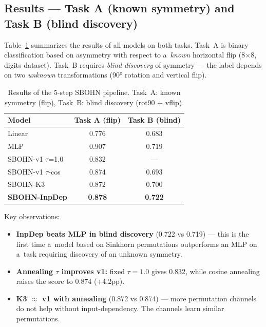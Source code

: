 \subsection{Results --- Task A (known symmetry) and Task B (blind discovery)}

Table~\ref{tab:sbohn_5steps} summarizes the results of all models on both tasks.
Task~A is binary classification based on asymmetry with respect to a~\emph{known} horizontal flip (8$\times$8, digits dataset).
Task~B requires \emph{blind discovery} of symmetry --- the label depends on two \emph{unknown} transformations (90° rotation and vertical flip).

\begin{table}[h]
\centering
\caption{Results of the 5-step SBOHN pipeline. Task~A: known symmetry (flip), Task~B: blind discovery (rot90 + vflip).}
\label{tab:sbohn_5steps}
\begin{tabular}{lcc}
\hline
\textbf{Model} & \textbf{Task A (flip)} & \textbf{Task B (blind)} \\
\hline
Linear             & 0.776 & 0.683 \\
MLP                & 0.907 & 0.719 \\
SBOHN-v1 $\tau$=1.0  & 0.832 & --- \\
SBOHN-v1 $\tau$-cos   & 0.874 & 0.693 \\
SBOHN-K3           & 0.872 & 0.700 \\
\textbf{SBOHN-InpDep} & \textbf{0.878} & \textbf{0.722} \\
\hline
\end{tabular}
\end{table}

Key observations:
\begin{itemize}
    \item \textbf{InpDep beats MLP in blind discovery} (0.722 vs 0.719) --- this is the first time a~model based on Sinkhorn permutations outperforms an MLP on a~task requiring discovery of an unknown symmetry.
    \item \textbf{Annealing $\tau$ improves v1:} fixed $\tau=1.0$ gives 0.832, while cosine annealing raises the score to 0.874 (+4.2pp).
    \item \textbf{K3 $\approx$ v1 with annealing} (0.872 vs 0.874) --- more permutation channels do not help without input-dependency. The channels learn similar permutations.
\end{itemize}
